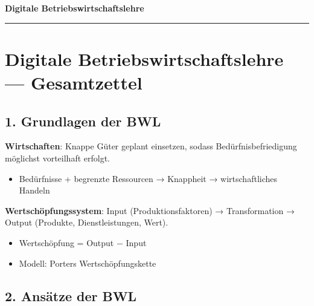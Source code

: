 \documentclass[11pt, a4paper]{article}
\providecommand{\nichttitle}{Lernzettel}
\renewcommand{\nichttitle}{Digitale Betriebswirtschaftslehre}
\begin{document}
\begin{center}
{\bfseries\Large\color{accent}\nichttitle}\\[2pt]
\color{accent}\rule{0.35\linewidth}{1pt}\color{black}
\end{center}
\vspace{2pt}

{\small\tableofcontents}
\newpage


\section{Digitale Betriebswirtschaftslehre — Gesamtzettel}


\subsection{1. Grundlagen der BWL}

\textbf{Wirtschaften}: Knappe Güter geplant einsetzen, sodass Bedürfnisbefriedigung möglichst vorteilhaft erfolgt.

\begin{itemize}
  \item Bedürfnisse + begrenzte Ressourcen → Knappheit → wirtschaftliches Handeln
\end{itemize}

\textbf{Wertschöpfungssystem}: Input (Produktionsfaktoren) → Transformation → Output (Produkte, Dienstleistungen, Wert).

\begin{itemize}
  \item Wertschöpfung = Output − Input
  \item Modell: Porters Wertschöpfungskette
\end{itemize}


\subsection{2. Ansätze der BWL}
\end{document}
